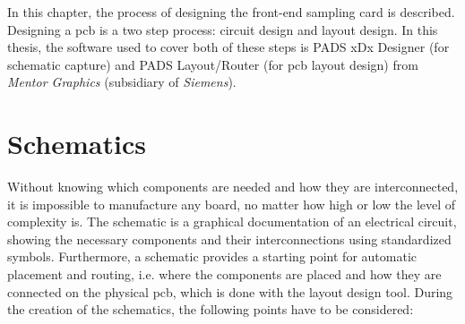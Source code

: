 In this chapter, the process of designing the front-end sampling card is described.
Designing a \gls{pcb} is a two step process: circuit design and layout design.
In this thesis, the software used to cover both of these steps is PADS xDx Designer (for schematic capture) and PADS Layout/Router (for \gls{pcb} layout design) from \textit{Mentor Graphics} (subsidiary of \textit{Siemens}).

\section{Schematics}\label{sec:schematics}
Without knowing which components are needed and how they are interconnected, it is impossible to manufacture any board, no matter how high or low the level of complexity is. 
The schematic is a graphical documentation of an electrical circuit, showing the necessary components and their interconnections using standardized symbols. 
Furthermore, a schematic provides a starting point for automatic placement and routing, i.e. where the components are placed and how they are connected on the physical \gls{pcb}, which is done with the layout design tool.
During the creation of the schematics, the following points have to be considered:

